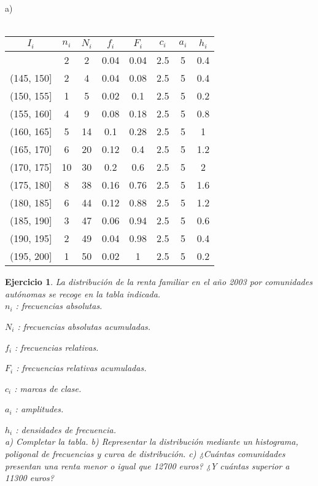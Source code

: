\documentclass{article}
\begin{document}
\bigskip \noindent
a) \\ \\
\begin{tabular}{|c|c|c|c|c|c|c|c|}
    $I_i$      & $n_i$ & $N_i$ & $f_i$ & $F_i$ & $c_i$ & $a_i$ & $h_i$ \\
    \hline
    [140, 145] & 2     & 2     & 0.04  & 0.04  & 2.5   & 5     & 0.4   \\
    \hline
    (145, 150] & 2     & 4     & 0.04  & 0.08  & 2.5   & 5     & 0.4   \\
    \hline
    (150, 155] & 1     & 5     & 0.02  & 0.1   & 2.5   & 5     & 0.2   \\
    \hline
    (155, 160] & 4     & 9     & 0.08  & 0.18  & 2.5   & 5     & 0.8   \\
    \hline
    (160, 165] & 5     & 14    & 0.1   & 0.28  & 2.5   & 5     & 1     \\
    \hline
    (165, 170] & 6     & 20    & 0.12  & 0.4   & 2.5   & 5     & 1.2   \\
    \hline
    (170, 175] & 10    & 30    & 0.2   & 0.6   & 2.5   & 5     & 2     \\
    \hline
    (175, 180] & 8     & 38    & 0.16  & 0.76  & 2.5   & 5     & 1.6   \\
    \hline
    (180, 185] & 6     & 44    & 0.12  & 0.88  & 2.5   & 5     & 1.2   \\
    \hline
    (185, 190] & 3     & 47    & 0.06  & 0.94  & 2.5   & 5     & 0.6   \\
    \hline
    (190, 195] & 2     & 49    & 0.04  & 0.98  & 2.5   & 5     & 0.4   \\
    \hline
    (195, 200] & 1     & 50    & 0.02  & 1     & 2.5   & 5     & 0.2   \\
    \hline
\end{tabular}

\bigskip
\newtheorem{ej3}{Ejercicio}
\begin{ej3}
    La distribución de la renta familiar en el año 2003 por comunidades autónomas se
    recoge en la tabla indicada.\\

    $n_i$ : frecuencias absolutas.\par
    $N_i$ : frecuencias absolutas acumuladas.\par
    $f_i$ : frecuencias relativas.\par
    $F_i$ : frecuencias relativas acumuladas.\par
    $c_i$ : marcas de clase.\par
    $a_i$ : amplitudes.\par
    $h_i$ : densidades de frecuencia.\\

    \noindent
    a) Completar la tabla.\newline
    b) Representar la distribución mediante un histograma, poligonal de
    frecuencias y curva de distribución.
    c) ¿Cuántas comunidades presentan una renta menor o igual que 12700 euros?
    ¿Y cuántas superior a 11300 euros?
\end{ej3}
\end{document}
